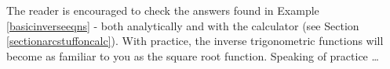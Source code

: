 {\begin{enumerate}
\medskip


\end{enumerate}
}

\medskip

 The reader is encouraged to check the answers found in Example \ref{basicinverseeqns} - both analytically and with the calculator (see Section \ref{sectionarcstuffoncalc}).  With practice, the inverse trigonometric functions will become as familiar to you as the square root function.  Speaking of practice \dots


